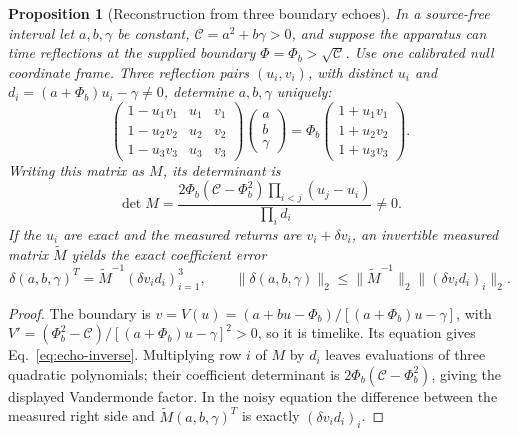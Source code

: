 \documentclass[12pt,a4paper]{article}
\newtheorem{proposition}[theorem]{Proposition}
\begin{document}
\begin{proposition}[Reconstruction from three boundary echoes]\label{prop:echo}
In a source-free interval let $a,b,\gamma$ be constant, $\mathcal C=a^2+b\gamma>0$,
and suppose the apparatus can time reflections at the supplied boundary
$\Phi=\Phi_b>\sqrt{\mathcal C}$. Use one calibrated null coordinate frame.
Three reflection pairs $(u_i,v_i)$, with distinct $u_i$ and
$d_i=(a+\Phi_b)u_i-\gamma\ne0$, determine $a,b,\gamma$ uniquely:
\begin{equation}\label{eq:echo-inverse}
 \begin{pmatrix}
 1-u_1v_1&u_1&v_1\\
 1-u_2v_2&u_2&v_2\\
 1-u_3v_3&u_3&v_3
 \end{pmatrix}
 \begin{pmatrix}a\\b\\\gamma\end{pmatrix}
 =\Phi_b
 \begin{pmatrix}1+u_1v_1\\1+u_2v_2\\1+u_3v_3\end{pmatrix}.
\end{equation}
Writing this matrix as $M$, its determinant is
\[
 \det M=
 \frac{2\Phi_b(\mathcal C-\Phi_b^2)
       \prod_{i<j}(u_j-u_i)}{\prod_i d_i}\ne0.
\]
If the $u_i$ are exact and the measured returns are $v_i+\delta v_i$, an
invertible measured matrix $\widetilde M$ yields the exact coefficient error
\begin{equation}\label{eq:echo-error}
 \delta(a,b,\gamma)^T
 =\widetilde M^{-1}(\delta v_i d_i)_{i=1}^3,\qquad
 \|\delta(a,b,\gamma)\|_2
 \le\|\widetilde M^{-1}\|_2\|(\delta v_i d_i)_i\|_2.
\end{equation}
\end{proposition}
\begin{proof}
The boundary is
$v=V(u)=(a+bu-\Phi_b)/[(a+\Phi_b)u-\gamma]$,
with $V'=(\Phi_b^2-\mathcal C)/[(a+\Phi_b)u-\gamma]^2>0$, so it is timelike.
Its equation gives Eq.~\eqref{eq:echo-inverse}. Multiplying row $i$ of $M$ by
$d_i$ leaves evaluations of three quadratic polynomials; their coefficient
determinant is $2\Phi_b(\mathcal C-\Phi_b^2)$, giving the displayed Vandermonde
factor. In the noisy equation the difference between the measured right side
and $\widetilde M(a,b,\gamma)^T$ is exactly $(\delta v_i d_i)_i$.
\end{proof}
\end{document}
